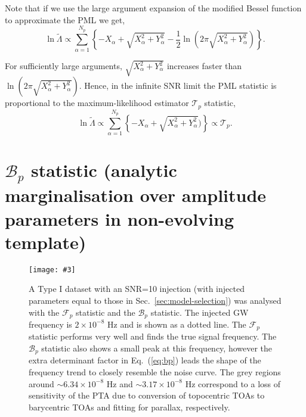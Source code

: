 \documentclass[prd,twocolumn,showpacs,nofootinbib]{revtex4}
\newcommand{\incgraph}[3]{\texttt{[image: \#3]}}
\begin{document}
Note that if we use the large argument expansion of the modified Bessel function to approximate the PML we get,
\begin{equation}
\ln\tilde\Lambda \propto \sum_{\alpha=1}^{N_p}\left\{-X_{\alpha} + \sqrt{X_{\alpha}^2+Y_{\alpha}^2}-\frac{1}{2}\ln\left(2\pi\sqrt{X_{\alpha}^2+Y_{\alpha}^2}\right)\right\}.
\end{equation}

For sufficiently large arguments, $\sqrt{X_{\alpha}^2+Y_{\alpha}^2}$ increases faster than $\ln\left(2\pi\sqrt{X_{\alpha}^2+Y_{\alpha}^2}\right)$. Hence, in the infinite SNR limit the PML statistic is proportional to the maximum-likelihood estimator $\mathcal{T}_p$ statistic,
\begin{equation}
\ln\tilde\Lambda \propto \sum_{\alpha=1}^{N_p}\left\{-X_{\alpha} + \sqrt{X_{\alpha}^2+Y_{\alpha}^2})\right\} \propto\mathcal{T}_p.
\end{equation}


\section{$\mathcal{B}_p$ statistic (analytic marginalisation over amplitude parameters in non-evolving template)} \label{sec:BpStatistic_sec}

\begin{figure*}
  \centering
   \incgraph{0}{0.8}{FpBp_Compare.pdf}
   \caption{\label{fig:BpStat}A Type I dataset with an SNR=10 injection (with injected parameters equal to those in Sec.\ \ref{sec:model-selection}) was analysed with the $\mathcal{F}_p$ statistic and the $\mathcal{B}_p$ statistic. The injected GW frequency is $2\times 10^{-8}$ Hz and is shown as a dotted line. The $\mathcal{F}_p$ statistic performs very well and finds the true signal frequency. The $\mathcal{B}_p$ statistic also shows a small peak at this frequency, however the extra determinant factor in Eq.\ (\ref{eq:bp}) leads the shape of the frequency trend to closely resemble the noise curve. The grey regions around $\sim 6.34\times 10^{-8}$ Hz and $\sim 3.17\times 10^{-8}$ Hz correspond to a loss of sensitivity of the PTA due to conversion of topocentric TOAs to barycentric TOAs and fitting for parallax, respectively.} 
 \end{figure*}
\end{document}
